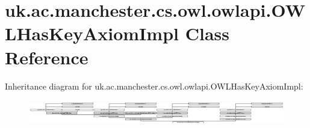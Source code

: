 \hypertarget{classuk_1_1ac_1_1manchester_1_1cs_1_1owl_1_1owlapi_1_1_o_w_l_has_key_axiom_impl}{\section{uk.\-ac.\-manchester.\-cs.\-owl.\-owlapi.\-O\-W\-L\-Has\-Key\-Axiom\-Impl Class Reference}
\label{classuk_1_1ac_1_1manchester_1_1cs_1_1owl_1_1owlapi_1_1_o_w_l_has_key_axiom_impl}
}
Inheritance diagram for uk.\-ac.\-manchester.\-cs.\-owl.\-owlapi.\-O\-W\-L\-Has\-Key\-Axiom\-Impl\-:\begin{figure}[H]
\begin{center}
\leavevmode
\includegraphics[height=1.116173cm]{classuk_1_1ac_1_1manchester_1_1cs_1_1owl_1_1owlapi_1_1_o_w_l_has_key_axiom_impl}
\end{center}
\end{figure}
